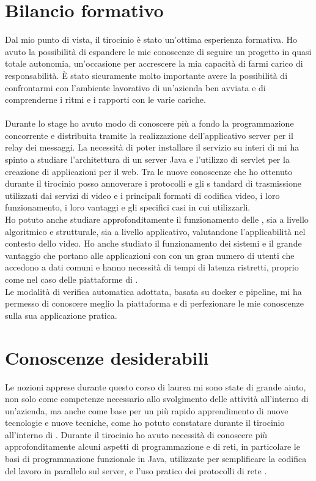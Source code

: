 \section{Bilancio formativo}
Dal mio punto di vista, il tirocinio è stato un'ottima esperienza formativa. Ho avuto la possibilità di espandere le mie conoscenze di seguire un progetto in quasi totale autonomia, un'occasione per accrescere la mia capacità di farmi carico di responsabilità. È stato sicuramente molto importante avere la possibilità di confrontarmi con l'ambiente lavorativo di un'azienda ben avviata e di comprenderne i ritmi e i rapporti con le varie cariche.
\paragraph*{}
Durante lo stage ho avuto modo di conoscere più a fondo la programmazione concorrente e distribuita tramite la realizzazione dell'applicativo server per il relay dei messaggi. La necessità di poter installare il servizio su interi  di  mi ha spinto a studiare l'architettura di un server Java e l'utilizzo di servlet per la creazione di applicazioni per il web. Tra le nuove conoscenze che ho ottenuto durante il tirocinio posso annoverare i protocolli e gli s  tandard di trasmissione utilizzati dai servizi di  video e i principali formati di codifica video, i loro funzionamento, i loro vantaggi e gli specifici casi in cui utilizzarli.
\\
Ho potuto anche studiare approfonditamente il funzionamento delle , sia a livello algoritmico e strutturale, sia a livello applicativo, valutandone l'applicabilità nel contesto dello  video. Ho anche studiato il funzionamento dei sistemi  e il grande vantaggio che portano alle applicazioni con con un gran numero di utenti che accedono a dati comuni e hanno necessità di tempi di latenza ristretti, proprio come nel caso delle piattaforme di . 
\\
Le modalità di verifica automatica adottata, basata su docker e pipeline, mi ha permesso di conoscere meglio la piattaforma e di perfezionare le mie conoscenze sulla sua applicazione pratica.

\section{Conoscenze desiderabili}
Le nozioni apprese durante questo corso di laurea mi sono state di grande aiuto, non solo come competenze necessario allo svolgimento delle attività all'interno di un'azienda, ma anche come base per un più rapido apprendimento di nuove tecnologie e nuove tecniche, come ho potuto constatare durante il tirocinio all'interno di \nomeAzienda{}. Durante il tirocinio ho avuto necessità di conoscere più approfonditamente alcuni aspetti di programmazione e di reti, in particolare le basi di programmazione funzionale in Java, utilizzate per semplificare la codifica del lavoro in parallelo sul server, e l'uso pratico dei protocolli di rete .
